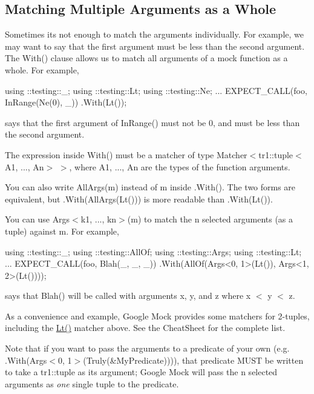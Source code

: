 \subsection*{Matching Multiple Arguments as a Whole}

Sometimes it\textquotesingle{}s not enough to match the arguments individually. For example, we may want to say that the first argument must be less than the second argument. The {\ttfamily With()} clause allows us to match all arguments of a mock function as a whole. For example,


\begin{DoxyCode}
using ::testing::\_;
using ::testing::Lt;
using ::testing::Ne;
...
  EXPECT\_CALL(foo, InRange(Ne(0), \_))
      .With(Lt());
\end{DoxyCode}


says that the first argument of {\ttfamily In\+Range()} must not be 0, and must be less than the second argument.

The expression inside {\ttfamily With()} must be a matcher of type {\ttfamily Matcher$<$tr1\+::tuple$<$A1, ..., An$>$ $>$}, where {\ttfamily A1}, ..., {\ttfamily An} are the types of the function arguments.

You can also write {\ttfamily All\+Args(m)} instead of {\ttfamily m} inside {\ttfamily .With()}. The two forms are equivalent, but {\ttfamily .With(All\+Args(\+Lt()))} is more readable than {\ttfamily .With(\+Lt())}.

You can use {\ttfamily Args$<$k1, ..., kn$>$(m)} to match the {\ttfamily n} selected arguments (as a tuple) against {\ttfamily m}. For example,


\begin{DoxyCode}
using ::testing::\_;
using ::testing::AllOf;
using ::testing::Args;
using ::testing::Lt;
...
  EXPECT\_CALL(foo, Blah(\_, \_, \_))
      .With(AllOf(Args<0, 1>(Lt()), Args<1, 2>(Lt())));
\end{DoxyCode}


says that {\ttfamily Blah()} will be called with arguments {\ttfamily x}, {\ttfamily y}, and {\ttfamily z} where {\ttfamily x $<$ y $<$ z}.

As a convenience and example, Google Mock provides some matchers for 2-\/tuples, including the {\ttfamily \hyperlink{namespacetesting_ad621459957a8bcdd3c256b7940ecbf99}{Lt()}} matcher above. See the Cheat\+Sheet for the complete list.

Note that if you want to pass the arguments to a predicate of your own (e.\+g. {\ttfamily .With(Args$<$0, 1$>$(Truly(\&\+My\+Predicate)))}), that predicate M\+U\+ST be written to take a {\ttfamily tr1\+::tuple} as its argument; Google Mock will pass the {\ttfamily n} selected arguments as {\itshape one} single tuple to the predicate.

